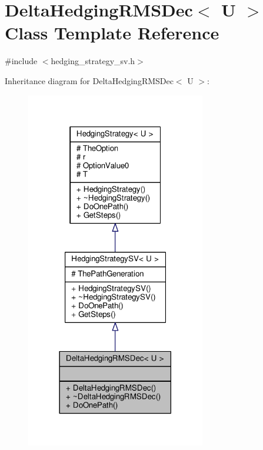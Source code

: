 \hypertarget{classDeltaHedgingRMSDec}{}\section{Delta\+Hedging\+R\+M\+S\+Dec$<$ U $>$ Class Template Reference}
\label{classDeltaHedgingRMSDec}


{\ttfamily \#include $<$hedging\+\_\+strategy\+\_\+sv.\+h$>$}



Inheritance diagram for Delta\+Hedging\+R\+M\+S\+Dec$<$ U $>$\+:
\nopagebreak
\begin{figure}[H]
\begin{center}
\leavevmode
\includegraphics[width=222pt]{classDeltaHedgingRMSDec__inherit__graph}
\end{center}
\end{figure}



